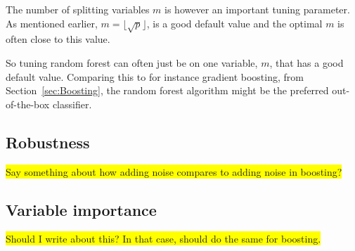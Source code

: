 The number of splitting variables $m$ is however an important tuning parameter. As mentioned earlier, $m = \lfloor \sqrt{p} \rfloor$, is a good default value and the optimal $m$ is often close to this value. 

So tuning random forest can often just be on one variable, $m$, that has a good default value. Comparing this to for instance gradient boosting, from Section~\ref{sec:Boosting}, the random forest algorithm might be the preferred out-of-the-box classifier. 


\subsection{Robustness}
\label{sub:Robustness}
\colorbox{yellow}{Say something about how adding noise compares to adding noise in boosting?}

\subsection{Variable importance}
\label{sub:Variable importance}
\colorbox{yellow}{Should I write about this? In that case, should do the same for boosting.}
